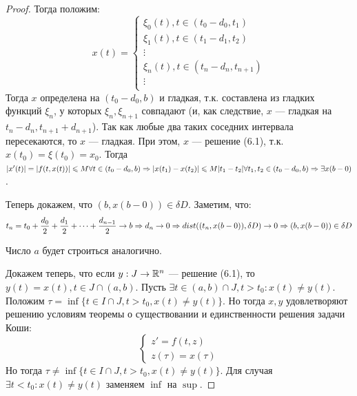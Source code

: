 \begin{proof}
    Тогда положим:
    \[x(t) = \left\{\begin{array}{l}
        \xi_0(t), t \in (t_0 - d_0, t_1) \\
        \xi_1(t), t \in (t_1 - d_1, t_2) \\
        \vdots \\
        \xi_n(t), t \in (t_n - d_n, t_{n + 1}) \\
        \vdots \\
    \end{array}\right.\]
    Тогда \(x\) определена на \((t_0 - d_0, b)\) и гладкая, т.к. составлена из гладких функций \(\xi_n\), у которых \(\xi_n, \xi_{n + 1}\) совпадают (и, как следствие, \(x\) --- гладкая на \(t_{n} - d_n, t_{n + 1} + d_{n + 1}\)). Так как любые два таких соседних интервала пересекаются, то \(x\) --- гладкая. При этом, \(x\) --- решение (6.1), т.к. \(x(t_0) = \xi(t_0) = x_0\). Тогда \(|x'(t)| = |f(t, x(t))| \leqslant M \forall t \in (t_0 - d_0, b) \Rightarrow |x(t_1) - x(t_2)| \leqslant M|t_1 - t_2| \forall t_1, t_2 \in (t_0 - d_0, b) \Rightarrow \exists x(b - 0)\).

    Теперь докажем, что \((b, x(b - 0)) \in \delta D\). Заметим, что:
    \[t_n = t_0 + \frac{d_0}{2} + \frac{d_1}{2} + \dots  + \frac{d_{n - 1}}{2} \rightarrow b \Rightarrow d_n \rightarrow 0 \Rightarrow dist((t_n, x(b - 0)), \delta D) \rightarrow 0 \Rightarrow (b, x(b - 0)) \in \delta D\]

    Число \(a\) будет строиться аналогично.

    Докажем теперь, что если \(y: J \rightarrow \mathbb{R}^n\) --- решение (6.1), то \(y(t) = x(t), t \in J \cap (a, b)\). Пусть \(\exists t \in (a, b) \cap J, t > t_0: x(t) \ne y(t)\). Положим \(\tau = \inf\{t \in I \cap J, t > t_0, x(t) \ne y(t)\}\). Но тогда \(x, y\) удовлетворяют решению условиям теоремы о существовании и единственности решения задачи Коши:
    \begin{equation*}
        \begin{cases}
            z' = f(t, z) \\
            z(\tau) = x(\tau)
        \end{cases}
    \end{equation*}
    Но тогда \(\tau \ne \inf\{t \in I \cap J, t > t_0, x(t) \ne y(t)\}\). Для случая \(\exists t < t_0: x(t) \ne y(t)\) заменяем \(\inf\) на \(\sup\).
\end{proof}

